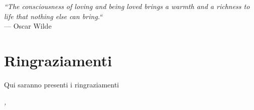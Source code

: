 
\cleardoublepage
{}
{}

\begin{flushright}{
	\slshape    
	``The consciousness of loving and being loved brings a warmth and a richness to life that nothing else can bring.``} \\ 
	\medskip
    --- Oscar Wilde
\end{flushright}


\bigskip

\begingroup
\let\clearpage\relax
\let\cleardoublepage\relax
\let\cleardoublepage\relax

\chapter*{Ringraziamenti}
Qui saranno presenti i ringraziamenti
\bigskip

\noindent\textit{\myLocation, \myTime}
\hfill \myName

\endgroup

